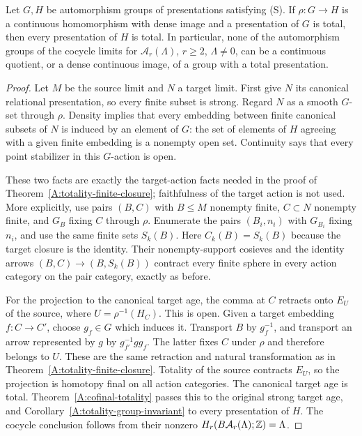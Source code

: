 \begin{corollary}
\label{A:totality-dense-image}
Let $G,H$ be automorphism groups of presentations satisfying (S).
If $\rho:G\to H$ is a continuous homomorphism with dense image
and a presentation of $G$ is total, then every presentation of $H$
is total. In particular, none of the automorphism groups of the
cocycle limits for $\mathcal A_r(\Lambda)$, $r\ge2$, $\Lambda\ne0$, can be
a continuous quotient, or a dense continuous image, of a group
with a total presentation.
\end{corollary}
\begin{proof}
Let $M$ be the source limit and $N$ a target limit. First give $N$
its canonical relational presentation, so every finite subset is
strong. Regard $N$ as a smooth $G$-set through $\rho$. Density
implies that every embedding between finite canonical subsets
of $N$ is induced by an element of $G$: the set of elements of
$H$ agreeing with a given finite embedding is a nonempty open
set. Continuity says that every point stabilizer in this
$G$-action is open.

These two facts are exactly the target-action facts needed in
the proof of Theorem~\ref{A:totality-finite-closure}; faithfulness
of the target action is not used. More explicitly, use pairs
$(B,C)$ with $B\le M$ nonempty finite, $C\subset N$ nonempty
finite, and $G_B$ fixing $C$ through $\rho$. Enumerate the pairs
$(B_i,n_i)$ with $G_{B_i}$ fixing $n_i$, and use the same finite
sets $S_k(B)$. Here $C_k(B)=S_k(B)$ because the target closure
is the identity. Their nonempty-support cosieves and the identity
arrows $(B,C)\to(B,S_k(B))$ contract every finite sphere in
every action category on the pair category, exactly as before.

For the projection to the canonical target age, the comma at
$C$ retracts onto $E_U$ of the source, where
$U=\rho^{-1}(H_C)$. This is open. Given a target embedding
$f:C\to C'$, choose $g_f\in G$ which induces it. Transport
$B$ by $g_f^{-1}$, and transport an arrow represented by $g$
by $g_{f'}^{-1}gg_f$. The latter fixes $C$ under $\rho$ and
therefore belongs to $U$. These are the same retraction and
natural transformation as in Theorem~\ref{A:totality-finite-closure}.
Totality of the source contracts $E_U$, so the projection is
homotopy final on all action categories. The canonical target
age is total. Theorem~\ref{A:cofinal-totality} passes this to
the original strong target age, and
Corollary~\ref{A:totality-group-invariant} to every presentation
of $H$. The cocycle conclusion follows from their nonzero
$H_r(B\mathcal A_r(\Lambda);\mathbb Z)=\Lambda$.
\end{proof}


